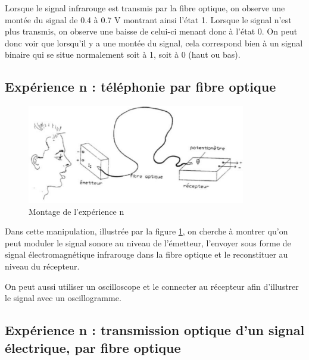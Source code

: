 \documentclass[a4paper]{article}
\begin{document}
Lorsque le signal infrarouge est transmis par la fibre optique, on observe une montée du signal de 0.4 à 0.7 V montrant ainsi l’état 1. Lorsque le signal n’est plus transmis, on observe une baisse de celui-ci menant donc à l’état 0. On peut donc voir que lorsqu’il y a une montée du signal, cela correspond bien à un signal binaire qui se situe normalement soit à 1, soit à 0 (haut ou bas).










\subsection{Expérience n : téléphonie par fibre optique}





\begin{figure}[H]
    \centering
    \includegraphics[width=0.85\textwidth]{images/montage05.PNG}
    \caption{Montage de l'expérience n}
    \label{fig:montage05}
\end{figure}

Dans cette manipulation, illustrée par la figure \ref{fig:montage05}, on cherche à montrer qu'on peut moduler le signal sonore au niveau de l'émetteur, l'envoyer sous forme de signal électromagnétique infrarouge dans la fibre optique et le reconstituer au niveau du récepteur.

On peut aussi utiliser un oscilloscope et le connecter au récepteur afin d'illustrer le signal avec un oscillogramme.










\subsection{Expérience n : transmission optique d’un signal électrique, par fibre optique}
\end{document}
